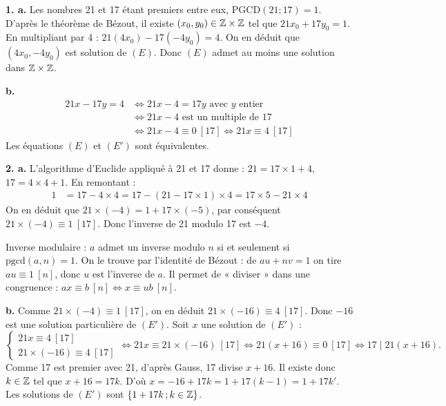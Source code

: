 \documentclass[11pt]{article}
\begin{document}


\textbf{1. a.} Les nombres 21 et 17 étant premiers entre eux, $\mathrm{PGCD}(21;17) = 1$. D'après le théorème de Bézout, il existe $(x_0, y_0) \in \mathbb{Z} \times \mathbb{Z}$ tel que $21x_0 + 17y_0 = 1$. En multipliant par 4 : $21(4x_0) - 17(-4y_0) = 4$. On en déduit que $(4x_0, -4y_0)$ est solution de $(E)$. Donc $(E)$ admet au moins une solution dans $\mathbb{Z} \times \mathbb{Z}$.

\textbf{b.}
\begin{align*}
21x - 17y = 4 &\Longleftrightarrow 21x - 4 = 17y \text{ avec } y \text{ entier} \\
&\Longleftrightarrow 21x - 4 \text{ est un multiple de } 17 \\
&\Longleftrightarrow 21x - 4 \equiv 0\ [17] \Longleftrightarrow 21x \equiv 4\ [17]
\end{align*}
Les équations $(E)$ et $(E')$ sont équivalentes.

\textbf{2. a.} L'algorithme d'Euclide appliqué à 21 et 17 donne : $21 = 17 \times 1 + 4$, $17 = 4 \times 4 + 1$. En remontant :
\begin{align*}
1 &= 17 - 4 \times 4 = 17 - (21 - 17 \times 1) \times 4 = 17 \times 5 - 21 \times 4
\end{align*}
On en déduit que $21 \times (-4) = 1 + 17 \times (-5)$, par conséquent $21 \times (-4) \equiv 1\ [17]$. Donc l'inverse de 21 modulo 17 est $-4$.

\begin{rappel}
Inverse modulaire : $a$ admet un inverse modulo $n$ si et seulement si
$\mathrm{pgcd}(a, n) = 1$. On le trouve par l'identité de Bézout :
de $au + nv = 1$ on tire $au \equiv 1\ [n]$, donc $u$ est l'inverse
de $a$. Il permet de « diviser » dans une congruence :
$ax \equiv b\ [n] \Leftrightarrow x \equiv ub\ [n]$.
\end{rappel}

\textbf{b.} Comme $21 \times (-4) \equiv 1\ [17]$, on en déduit $21 \times (-16) \equiv 4\ [17]$. Donc $-16$ est une solution particulière de $(E')$. Soit $x$ une solution de $(E')$ :
\[ \begin{cases} 21x \equiv 4\ [17] \\ 21 \times (-16) \equiv 4\ [17] \end{cases} \Longleftrightarrow 21x \equiv 21 \times (-16)\ [17] \Longleftrightarrow 21(x + 16) \equiv 0\ [17] \Longleftrightarrow 17 \mid 21(x + 16). \]
Comme 17 est premier avec 21, d'après Gauss, 17 divise $x + 16$. Il existe donc $k \in \mathbb{Z}$ tel que $x + 16 = 17k$. D'où $x = -16 + 17k = 1 + 17(k - 1) = 1 + 17k'$. Les solutions de $(E')$ sont $\{1 + 17k\,;k \in \mathbb{Z}\}$.
\end{document}
